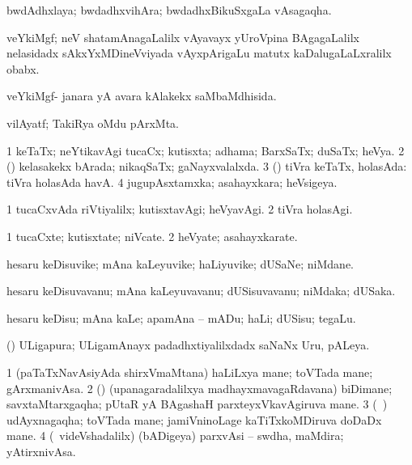 \bentry
{} 
\gl{\nA}
\expl{}
\bmng
 bwdAdhxlaya; bwdadhxvihAra; bwdadhxBikuSxgaLa vAsagaqha. 
\emng
\eentry

\bentry
{} 
\gl{\nA}
\expl{}
\bmng
 veYkiMgf; neV shatamAnagaLalilx vAyavayx yUroVpina BAgagaLalilx nelasidadx sAkxYxMDineVviyada vAyxpArigaLu matutx kaDalugaLaLxralilx obabx. 
\emng
\eentry

\bentry
{} 
\gl{\gu}
\expl{}
\bmng
 veYkiMgf- janara yA avara kAlakekx saMbaMdhisida. 
\emng
\eentry

\bentry
{} 
\gl{\nA}
\expl{}
\bmng
 vilAyatf; TakiRya oMdu pArxMta. 
\emng
\eentry

\bentry
{} 
\gl{\gu}
\expl{}
\bmng
\bnum
\num{1} keTaTx; neYtikavAgi tucaCx; kutisxta; adhama; BarxSaTx; duSaTx; heVya. 
\num{2} (\pArxparx) kelasakekx bArada; nikaqSaTx; gaNayxvalalxda. 
\num{3} (\AmA) tiVra keTaTx, holasAda:  tiVra holasAda havA. 
\num{4} jugupAsxtamxka; asahayxkara; heVsigeya. 
\enum
\emng
\eentry

\bentry
{} 
\gl{\kirxvi}
\expl{}
\bmng
\bnum
\num{1} tucaCxvAda riVtiyalilx; kutisxtavAgi; heVyavAgi. 
\num{2} tiVra holasAgi. 
\enum
\emng
\eentry

\bentry
{} 
\gl{\nA}
\expl{}
\bmng
\bnum
\num{1} tucaCxte; kutisxtate; niVcate. 
\num{2} heVyate; asahayxkarate. 
\enum
\emng
\eentry

\bentry
{} 
\gl{\nA}
\expl{}
\bmng
 hesaru keDisuvike; mAna kaLeyuvike; haLiyuvike; dUSaNe; niMdane. 
\emng
\eentry

\bentry
{} 
\gl{\nA}
\expl{}
\bmng
 hesaru keDisuvavanu; mAna kaLeyuvavanu; dUSisuvavanu; niMdaka; dUSaka. 
\emng
\eentry

\bentry
{} 
\gl{\sakirx}
\bmng
 hesaru keDisu; mAna kaLe; apamAna -- mADu; haLi; dUSisu; tegaLu. 
\emng
\eentry

\bentry
{} 
\gl{\nA}
\expl{}
\bmng
 (\ca) ULigapura; ULigamAnayx padadhxtiyalilxdadx saNaNx Uru, pALeya. 
\emng
\eentry

\bentry
{} 
\gl{\nA}
\expl{}
\bmng
\bnum
\num{1} (paTaTxNavAsiyAda shirxVmaMtana) haLiLxya mane; toVTada mane; gArxmanivAsa. 
\num{2} (\birx) (upanagaradalilxya madhayxmavagaRdavana) biDimane; savxtaMtarxgaqha; pUtaR yA BAgashaH parxteyxVkavAgiruva mane. 
\num{3} (\roV\ \pArxkatx) udAyxnagaqha; toVTada mane; jamiVninoLage kaTiTxkoMDiruva doDaDx mane. 
\num{4} (\kanmu\ videVshadalilx) (bADigeya) parxvAsi -- swdha, maMdira; yAtirxnivAsa. 
\enum
\emng
\eentry

